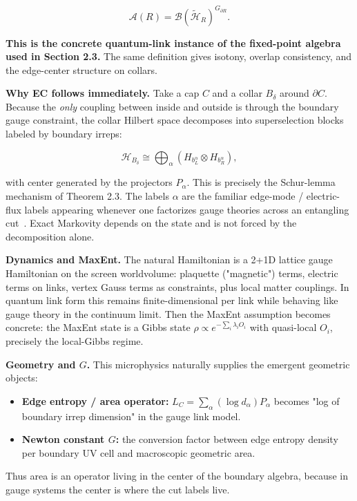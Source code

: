 \[
\mathcal{A}(R) = \mathcal{B}(\tilde{\mathcal{H}}_R)^{G_{\partial R}}.
\]

\textbf{This is the concrete quantum-link instance of the fixed-point algebra used in Section 2.3.} The same definition gives isotony, overlap consistency, and the edge-center structure on collars.

\textbf{Why EC follows immediately.} Take a cap \(C\) and a collar \(B_\delta\) around \(\partial C\). Because the \emph{only} coupling between inside and outside is through the boundary gauge constraint, the collar Hilbert space decomposes into superselection blocks labeled by boundary irreps:

\[
\mathcal{H}_{B_\delta} \cong \bigoplus_\alpha (H_{b_L^\alpha} \otimes H_{b_R^\alpha}),
\]

with center generated by the projectors \(P_\alpha\). This is precisely the Schur-lemma mechanism of Theorem 2.3. The labels \(\alpha\) are the familiar edge-mode / electric-flux labels appearing whenever one factorizes gauge theories across an entangling cut~\cite{donnellyWall15}. Exact Markovity depends on the state and is not forced by the decomposition alone.

\textbf{Dynamics and MaxEnt.} The natural Hamiltonian is a 2+1D lattice gauge Hamiltonian on the screen worldvolume: plaquette ("magnetic") terms, electric terms on links, vertex Gauss terms as constraints, plus local matter couplings. In quantum link form this remains finite-dimensional per link while behaving like gauge theory in the continuum limit. Then the MaxEnt assumption becomes concrete: the MaxEnt state is a Gibbs state \(\rho \propto e^{-\sum_i \lambda_i O_i}\) with quasi-local \(O_i\), precisely the local-Gibbs regime.

\textbf{Geometry and \(G\).} This microphysics naturally supplies the emergent geometric objects:

\begin{itemize}
\tightlist
\item
  \textbf{Edge entropy / area operator:} \(L_C = \sum_\alpha (\log d_\alpha) P_\alpha\) becomes "log of boundary irrep dimension" in the gauge link model.
\item
  \textbf{Newton constant \(G\):} the conversion factor between edge entropy density per boundary UV cell and macroscopic geometric area.
\end{itemize}

Thus area is an operator living in the center of the boundary algebra, because in gauge systems the center is where the cut labels live.

